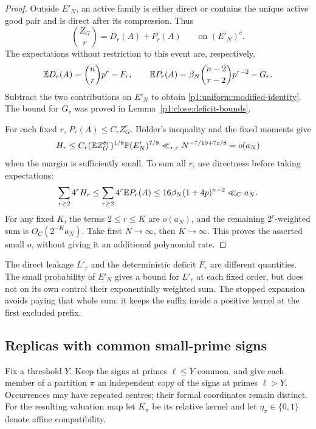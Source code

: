\begin{proof}
Outside \(E'_N\), an active family is either direct
or contains the unique active good pair and is
direct after its compression. Thus
\[
 \binom{Z_G}{r}=D_r(A)+P_r(A)
              \qquad\text{on }(E'_N)^c.
\]
The expectations without restriction to this event
are, respectively,
\[
 \mathbb E D_r(A)=\binom nrp^r-F_r,\qquad
 \mathbb E P_r(A)
     =\beta_N\binom{n-2}{r-2}p^{r-2}-G_r.
\]
Subtract the two contributions on \(E'_N\) to
obtain \eqref{p1:uniform:modified-identity}.
The bound for \(G_r\) was proved in
Lemma~\ref{p1:close:deficit-bounds}.

For each fixed \(r\), \(P_r(A)\le C_rZ_G^r\).
H\"older's inequality and the fixed moments give
\[
 H_r\le C_r(\mathbb E Z_G^{8r})^{1/8}
                  \mathbb P(E'_N)^{7/8}
       \ll_{r,\varepsilon}N^{-7/10+7\varepsilon/8}
       =o(a_N)
\]
when the margin is sufficiently small.
To sum all \(r\), use directness before taking
expectations:
\[
 \sum_{r\ge2}4^rH_r
 \le\sum_{r\ge2}4^r\mathbb E P_r(A)
 \le16\beta_N(1+4p)^{n-2}
       \ll_C a_N.
\]
For any fixed \(K\), the terms \(2\le r\le K\)
are \(o(a_N)\), and the remaining \(2^r\)-weighted
sum is \(O_C(2^{-K}a_N)\).
Take first \(N\to\infty\), then \(K\to\infty\).
This proves the asserted small \(o\), without
giving it an additional polynomial rate.
\end{proof}

The direct leakage \(L'_r\) and the deterministic
deficit \(F_r\) are different quantities.
The small probability of \(E'_N\) gives a bound
for \(L'_r\) at each fixed order, but does not
on its own control their exponentially weighted
sum. The stopped expansion avoids paying that
whole sum: it keeps the suffix inside a
positive kernel at the first excluded prefix.

\subsection{Replicas with common small-prime signs}

Fix a threshold \(Y\). Keep the signs at primes
\(\ell\le Y\) common, and give each member of a
partition \(\pi\) an independent copy of the signs
at primes \(\ell>Y\). Occurrences may have repeated
centres; their formal coordinates remain distinct.
For the resulting valuation map let \(K_\pi\)
be its relative kernel and let
\(\eta_\pi\in\{0,1\}\) denote affine compatibility.

